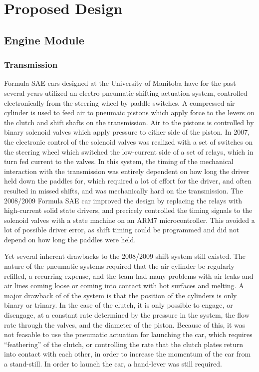 %
%
%
%

\section{Proposed Design}

%
%
\subsection{Engine Module}

\subsubsection{Transmission}

Formula SAE cars designed at the University of Manitoba have for the past several years utilized an electro-pneumatic shifting actuation system, controlled electronically from the steering wheel by paddle switches. A compressed air cylinder is used to feed air to pneumaic pistons which apply force to the levers on the clutch and shift shafts on the transmission. Air to the pistons is controlled by binary solenoid valves which apply pressure to either side of the piston. In 2007, the electronic control of the solenoid valves was realized with a set of switches on the steering wheel which switched the low-current side of a set of relays, which in turn fed current to the valves. In this system, the timing of the mechanical interaction with the transmission was entirely dependent on how long the driver held down the paddles for, which required a lot of effort for the driver, and often resulted in missed shifts, and was mechanically hard on the transmission. The 2008/2009 Formula SAE car improved the design by replacing the relays with high-current solid state drivers, and precicely controlled the timing signals to the solenoid valves with a state machine on an ARM7 microcontroller. This avoided a lot of possible driver error, as shift timing could be programmed and did not depend on how long the paddles were held.

Yet several inherent drawbacks to the 2008/2009 shift system still existed. The nature of the pneumatic systems required that the air cylinder be regularly refilled, a recurring expense, and the team had many problems with air leaks and air lines coming loose or coming into contact with hot surfaces and melting. A major drawback of of the system is that the position of the cylinders is only binary or trinary. In the case of the clutch, it is only possible to engage, or disengage, at a constant rate determined by the pressure in the system, the flow rate through the valves, and the diameter of the piston. Because of this, it was not feasable to use the pneumatic actuation for launching the car, which requires {}``feathering'' of the clutch, or controlling the rate that the clutch plates return into contact with each other, in order to increase the momentum of the car from a stand-still. In order to launch the car, a hand-lever was still required.

